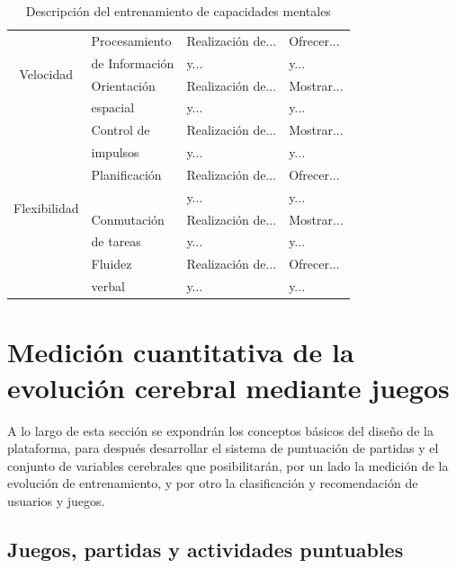 \begin{table}[h]
\begin{small}
\begin{center}
\begin{sideways}
\begin{tabular}{|c|l|l|l|}
\multirow{4}{*}{\begin{sideways}Velocidad\end{sideways}} & Procesamiento & Realización de... &  Ofrecer... \\
 & de Información & y... & y... \\
\cline{2-4}
 & Orientación & Realización de... & Mostrar... \\
 & espacial & y... & y... \\
\hline
\multirow{8}{*}{\begin{sideways}Flexibilidad\end{sideways}} & Control de & Realización de... & Mostrar... \\
 & impulsos & y... & y... \\
\cline{2-4}
& Planificación & Realización de... & Ofrecer... \\
& & y... & y... \\
\cline{2-4}
& Conmutación & Realización de... & Mostrar... \\
& de tareas & y... & y... \\
\cline{2-4}
& Fluidez  & Realización de... & Ofrecer... \\
& verbal  & y... & y... \\
\hline
\end{tabular}
\end{sideways}
\end{center}
\end{small}
\caption{Descripción del entrenamiento de capacidades mentales}
\end{table}


\section{Medición cuantitativa de la evolución cerebral mediante juegos}

A lo largo de esta sección se expondrán los conceptos básicos del diseño de la plataforma, para después desarrollar el sistema de puntuación de partidas y el conjunto de variables cerebrales que posibilitarán, por un lado la medición de la evolución de entrenamiento, y por otro la clasificación y recomendación de usuarios y juegos.

\subsection{Juegos, partidas y actividades puntuables}
\label{sec::juegos-partidas-actividades}

